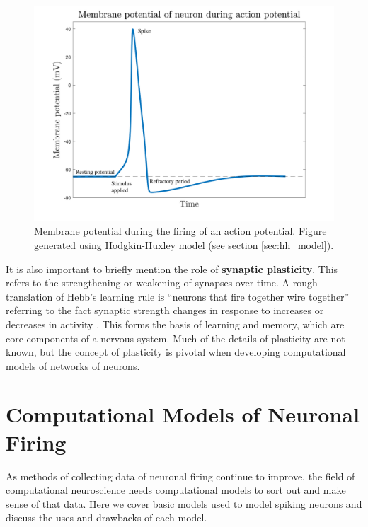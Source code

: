 \documentclass[11pt]{article}
\begin{document}
\begin{figure}[H]
    \centering
    \includegraphics[width=5in]{figures/membrane_v_during_spike.png}
    \caption{Membrane potential during the firing of an action potential. Figure generated using Hodgkin-Huxley model (see section \ref{sec:hh_model}).}
    \label{fig:membrane_v_during_spike}
\end{figure}

It is also important to briefly mention the role of \textbf{synaptic plasticity}. This refers to the strengthening or weakening of synapses over time. A rough translation of Hebb's learning rule is ``neurons that fire together wire together'' referring to the fact synaptic strength changes in response to increases or decreases in activity \citep{synaptic-plasticity}. This forms the basis of learning and memory, which are core components of a nervous system. Much of the details of plasticity are not known, but the concept of plasticity is pivotal when developing computational models of networks of neurons.

\section{Computational Models of Neuronal Firing}
\label{sec:models}

As methods of collecting data of neuronal firing continue to improve, the field of computational neuroscience needs computational models to sort out and make sense of that data. Here we cover basic models used to model spiking neurons and discuss the uses and drawbacks of each model.
\end{document}
